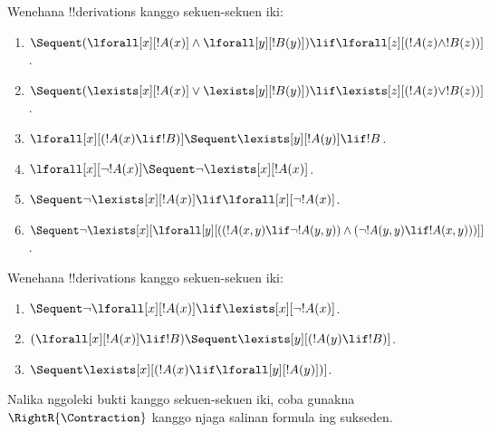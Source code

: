 \documentclass[../../../include/open-logic-section]{subfiles}
\begin{document}
\begin{prob}
Wenehana !!{derivation}s kanggo sekuen-sekuen iki:
\begin{enumerate}
\item $\Sequent (\lforall[x][!A(x)] \land \lforall[y][!B(y)]) \lif
\lforall[z][(!A(z) \land !B(z))]$.
\item $\Sequent (\lexists[x][!A(x)] \lor \lexists[y][!B(y)]) \lif
\lexists[z][(!A(z) \lor !B(z))]$.
\item $\lforall[x][(!A(x) \lif !B)] \Sequent \lexists[y][!A(y)] \lif !B$.
\item $\lforall[x][\lnot !A(x)] \Sequent \lnot\lexists[x][!A(x)]$.
\item $\Sequent \lnot\lexists[x][!A(x)] \lif \lforall[x][\lnot !A(x)]$.
\item $\Sequent \lnot\lexists[x][\lforall[y][((!A(x,y) \lif \lnot
!A(y,y)) \land (\lnot !A(y,y) \lif !A(x,y)))]]$.
\end{enumerate}
\end{prob}

\begin{prob}
Wenehana !!{derivation}s kanggo sekuen-sekuen iki:
\begin{enumerate}
\item $\Sequent \lnot\lforall[x][!A(x)] \lif \lexists[x][\lnot!A(x)]$.
\item $(\lforall[x][!A(x)] \lif !B) \Sequent \lexists[y][(!A(y) \lif !B)]$.
\item $\Sequent \lexists[x][(!A(x) \lif \lforall[y][!A(y)])]$.
\end{enumerate}
Nalika nggoleki bukti kanggo sekuen-sekuen iki, coba gunakna
$\RightR{\Contraction}$ kanggo njaga salinan formula ing sukseden.
\end{prob}
\end{document}
